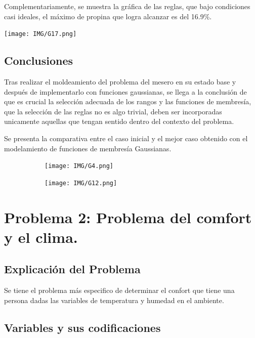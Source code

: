 \documentclass[11pt, letterpaper]{article}
\begin{document}
Complementariamente, se muestra la gráfica de las reglas, que bajo condiciones casi ideales, el máximo de propina que logra alcanzar es del 16.9\%.

\texttt{[image: IMG/G17.png]}

\subsection{Conclusiones}

Tras realizar el moldeamiento del problema del mesero en su estado base y después de implementarlo con funciones gaussianas, se llega a la conclusión de que es crucial la selección adecuada de los rangos y las funciones de membresía, que la selección de las reglas no es algo trivial, deben ser incorporadas unicamente aquellas que tengan sentido dentro del contexto del problema.

Se presenta la comparativa entre el caso inicial y el mejor caso obtenido con el modelamiento de funciones de membresía Gaussianas.

\begin{figure}[h]
	\centering
	\begin{subfigure}{0.42\textwidth} %
		\centering
		\texttt{[image: IMG/G4.png]}
		\label{fig:G111}
	\end{subfigure}
	\hfill
	\begin{subfigure}{0.42\textwidth} %
		\centering
		\texttt{[image: IMG/G12.png]}
		\label{fig:G112}
	\end{subfigure}
	\label{fig:comparacion2}
\end{figure}



\newpage


\section{Problema 2: Problema del comfort y el clima.}

\subsection{Explicación del Problema}

Se tiene el problema más especifico de determinar el confort que tiene una persona dadas las variables  de temperatura y humedad en el ambiente.


\subsection{Variables y sus codificaciones}
\end{document}
